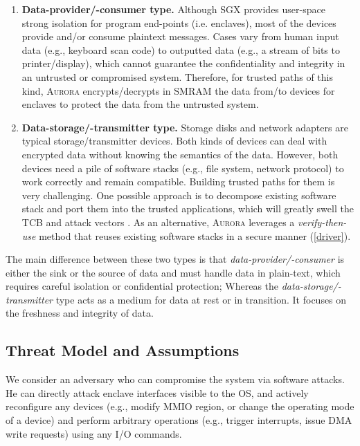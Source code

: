 \documentclass[journal,twocolumn,letterpaper,10pt]{IEEEtran}
\begin{document}
\begin{enumerate}

\item \textbf{Data-provider/-consumer type.}
Although SGX provides user-space strong isolation for program end-points (i.e. enclaves), most of the devices provide and/or consume plaintext messages. Cases vary from human input data (e.g., keyboard scan code) to outputted data (e.g., a stream of bits to printer/display), which cannot guarantee the confidentiality and integrity in an untrusted or compromised system. Therefore, for trusted paths of this kind, \textsc{Aurora} encrypts/decrypts in SMRAM the data from/to devices for enclaves to protect the data from the untrusted system.

\item \textbf{Data-storage/-transmitter type.} Storage disks and network adapters are typical storage/transmitter devices. Both kinds of devices can deal with encrypted data without knowing the semantics of the data. However, both devices need a pile of software stacks (e.g., file system, network protocol) to work correctly and remain compatible. Building trusted paths for them is very challenging. One possible approach is to decompose existing software stack and port them into the trusted applications, which will greatly swell the TCB and attack vectors \cite{weiser_sgxio:_2017}. As an alternative, \textsc{Aurora} leverages a \emph{verify-then-use} method that reuses existing software stacks in a secure manner (\autoref{driver}).

\end{enumerate}

The main difference between these two types is that \textit{data-provider/-consumer} is either the sink or the source of data and must handle data in plain-text, which requires careful isolation or confidential protection; Whereas the \textit{data-storage/-transmitter} type acts as a medium for data at rest or in transition. It focuses on the freshness and integrity of data.

\subsection{Threat Model and Assumptions}
We consider an adversary who can compromise the system via software attacks. He can directly attack enclave interfaces visible to the OS, and actively reconfigure any devices (e.g., modify MMIO region, or change the operating mode of a device) and perform arbitrary operations (e.g., trigger interrupts, issue DMA write requests) using any I/O commands.
\end{document}

